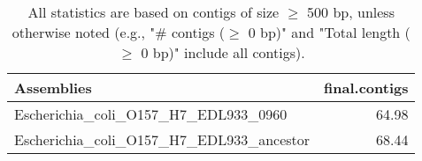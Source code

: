 \documentclass[12pt,a4paper]{article}
\begin{document}
\begin{table}[ht]
\begin{center}
\caption{All statistics are based on contigs of size $\geq$ 500 bp, unless otherwise noted (e.g., "\# contigs ($\geq$ 0 bp)" and "Total length ($\geq$ 0 bp)" include all contigs).}
\begin{tabular}{|l*{1}{|r}|}
\hline
Assemblies & final.contigs \\ \hline
Escherichia\_coli\_O157\_H7\_EDL933\_0960 & 64.98 \\ \hline
Escherichia\_coli\_O157\_H7\_EDL933\_ancestor & 68.44 \\ \hline
\end{tabular}
\end{center}
\end{table}
\end{document}
